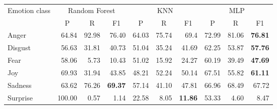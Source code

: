 \documentclass[11pt,a4paper]{article}
\begin{document}
\begin{table*}[]
\centering
\begin{tabular}{|l|rrr|rrr|rrr|}
\hline
\multicolumn{1}{|c|}{Emotion class} & \multicolumn{3}{c|}{Random Forest}                                      & \multicolumn{3}{c|}{KNN}                                                & \multicolumn{3}{c|}{MLP}                                                \\
\multicolumn{1}{|c|}{}              & \multicolumn{1}{c}{P} & \multicolumn{1}{c}{R} & \multicolumn{1}{c|}{F1} & \multicolumn{1}{c}{P} & \multicolumn{1}{c}{R} & \multicolumn{1}{c|}{F1} & \multicolumn{1}{c}{P} & \multicolumn{1}{c}{R} & \multicolumn{1}{c|}{F1} \\ \hline
Anger                               & 64.84                 & 92.98                 &  76.40                    & 64.03                 & 75.74                 & 69.4                    & 72.99                 & 81.06                 & {\bf 76.81}                   \\
Disgust                             & 56.63                 & 31.81                 & 40.73                   & 51.04                 & 35.24                 & 41.69                   & 62.25                 & 53.87                 & {\bf 57.76}                   \\
Fear                                & 58.06                 & 5.73                  & 10.43                   & 51.02                 & 15.92                 & 24.27                   & 60.19                 & 39.49                 & {\bf 47.69}                   \\
Joy                                 & 69.93                 & 31.94                 & 43.85                   & 48.21                 & 52.24                 & 50.14                   & 67.51                 & 55.82                 & {\bf 61.11}                   \\
Sadness                             & 63.62                 & 76.26                 & {\bf 69.37}                   & 57.14                 & 41.10                  & 47.81                   & 66.96                 & 68.49                 & 67.72                   \\
Surprise                            & 100.00                   & 0.57                  & 1.14                    & 22.58                 & 8.05                  & {\bf 11.86}                   & 53.33                 & 4.60                   & 8.47                    \\

\end{tabular}
\end{table*}
\end{document}
